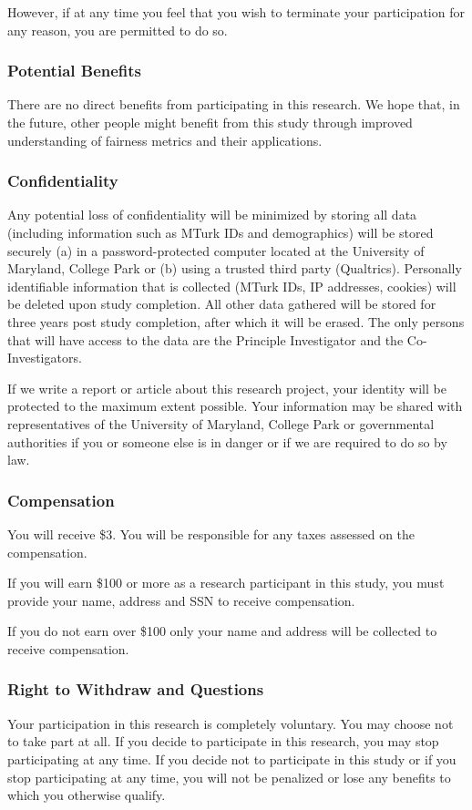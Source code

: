 \documentclass{article}
\begin{document}
However, if at any time you feel that you wish to terminate your participation for any reason, you are permitted to do so.

\subsubsection{Potential Benefits}
There are no direct benefits from participating in this research. We hope that, in the future, other people might benefit from this study through improved understanding of fairness metrics and their applications. 

\subsubsection{Confidentiality}
Any potential loss of confidentiality will be minimized by storing all data (including information such as MTurk IDs and demographics) will be stored securely (a) in a password-protected computer located at the University of Maryland, College Park or (b) using a trusted third party (Qualtrics). Personally identifiable information that is collected (MTurk IDs, IP addresses, cookies) will be deleted upon study completion. All other data gathered will be stored for three years post study completion, after which it will be erased.
The only persons that will have access to the data are the Principle Investigator and the Co-Investigators.

If we write a report or article about this research project, your identity will be protected to the maximum extent possible.  Your information may be shared with representatives of the University of Maryland, College Park or governmental authorities if you or someone else is in danger or if we are required to do so by law. 

\subsubsection{Compensation}
You will receive \$3. You will be responsible for any taxes assessed on the compensation.  

If you will earn \$100 or more as a research participant in this study, you must provide your name, address and SSN to receive compensation.

If you do not earn over \$100 only your name and address will be collected to receive compensation.

\subsubsection{Right to Withdraw and Questions}
Your participation in this research is completely voluntary.  You may choose not to take part at all.  If you decide to participate in this research, you may stop participating at any time.  If you decide not to participate in this study or if you stop participating at any time, you will not be penalized or lose any benefits to which you otherwise qualify.
\end{document}
